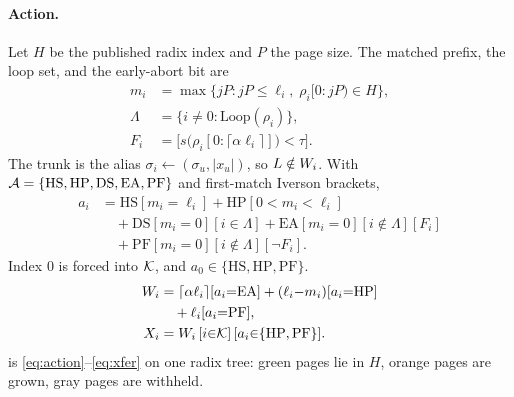 \paragraph{Action.}
Let $H$ be the published radix index and $P$ the page size.
The matched prefix, the loop set, and the early-abort bit are
\begin{align}
m_i &= \max\{jP: jP\le\ell_i,\;\rho_i[0{:}jP)\in H\}, \label{eq:mi-iv}\\
\Lambda &= \{i\neq 0:\mathrm{Loop}(\rho_i)\}, \nonumber\\
F_i &= \bigl[s\bigl(\rho_i[0{:}\lceil\alpha\ell_i\rceil]\bigr)<\tau\bigr]. \nonumber
\end{align}
The trunk is the alias $\sigma_i\leftarrow(\sigma_u,|x_u|)$, so $L\notin W_i$.
With $\mathcal{A}=\{\mathrm{HS},\mathrm{HP},\mathrm{DS},\mathrm{EA},\mathrm{PF}\}$ and first-match Iverson brackets,
\begin{equation}
\label{eq:action-iv}
\begin{aligned}
a_i &= \mathrm{HS}[m_i{=}\ell_i]
+\mathrm{HP}[0{<}m_i{<}\ell_i]\\
&\quad+\mathrm{DS}[m_i{=}0][i{\in}\Lambda]
+\mathrm{EA}[m_i{=}0][i{\notin}\Lambda][F_i]\\
&\quad+\mathrm{PF}[m_i{=}0][i{\notin}\Lambda][\neg F_i].
\end{aligned}
\end{equation}
Index $0$ is forced into $\mathcal{K}$, and $a_0\in\{\mathrm{HS},\mathrm{HP},\mathrm{PF}\}$.
\begin{align}
W_i &= \lceil\alpha\ell_i\rceil[a_i{=}\mathrm{EA}]
+(\ell_i{-}m_i)[a_i{=}\mathrm{HP}]\nonumber\\
&\quad+\ell_i[a_i{=}\mathrm{PF}], \label{eq:work-iv}\\
X_i &= W_i\,[i{\in}\mathcal{K}]\,[a_i{\in}\{\mathrm{HP},\mathrm{PF}\}]. \label{eq:xfer-iv}
\end{align}
 is \eqref{eq:action}--\eqref{eq:xfer} on one radix tree: green pages lie in $H$, orange pages are grown, gray pages are withheld.

